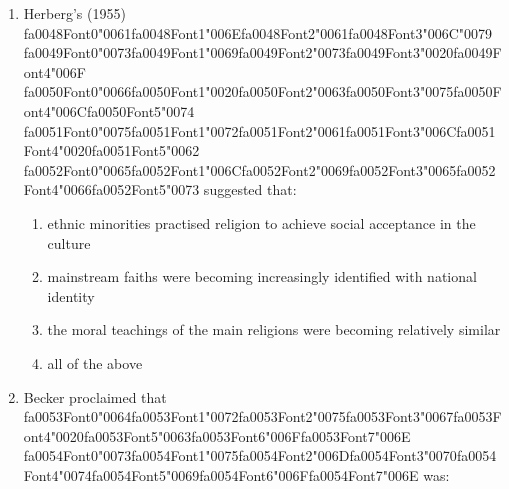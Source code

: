 \documentclass[12pt]{article}
\begin{document}
\begin{enumerate}[label=\arabic*.]
\begin{enumerate}[label=(\alph*)]
    \item punctuality, uninterrupted work and the threat of dismissal
    \item making routine tasks less monotonous
\end{enumerate}
\item Herberg's (1955) {\csname fa0048Font0\endcsname\char"0061}{\csname fa0048Font1\endcsname\char"006E}{\csname fa0048Font2\endcsname\char"0061}{\csname fa0048Font3\endcsname\char"006C}{\char"0079} {\csname fa0049Font0\endcsname\char"0073}{\csname fa0049Font1\endcsname\char"0069}{\csname fa0049Font2\endcsname\char"0073}{\csname fa0049Font3\endcsname\char"0020}{\csname fa0049Font4\endcsname\char"006F} {\csname fa0050Font0\endcsname\char"0066}{\csname fa0050Font1\endcsname\char"0020}{\csname fa0050Font2\endcsname\char"0063}{\csname fa0050Font3\endcsname\char"0075}{\csname fa0050Font4\endcsname\char"006C}{\csname fa0050Font5\endcsname\char"0074} {\csname fa0051Font0\endcsname\char"0075}{\csname fa0051Font1\endcsname\char"0072}{\csname fa0051Font2\endcsname\char"0061}{\csname fa0051Font3\endcsname\char"006C}{\csname fa0051Font4\endcsname\char"0020}{\csname fa0051Font5\endcsname\char"0062} {\csname fa0052Font0\endcsname\char"0065}{\csname fa0052Font1\endcsname\char"006C}{\csname fa0052Font2\endcsname\char"0069}{\csname fa0052Font3\endcsname\char"0065}{\csname fa0052Font4\endcsname\char"0066}{\csname fa0052Font5\endcsname\char"0073} suggested that:
\begin{enumerate}[label=(\alph*)]
    \item ethnic minorities practised religion to achieve social acceptance in the culture
    \item mainstream faiths were becoming increasingly identified with national identity
    \item the moral teachings of the main religions were becoming relatively similar
    \item all of the above
\end{enumerate}
\item Becker proclaimed that {\csname fa0053Font0\endcsname\char"0064}{\csname fa0053Font1\endcsname\char"0072}{\csname fa0053Font2\endcsname\char"0075}{\csname fa0053Font3\endcsname\char"0067}{\csname fa0053Font4\endcsname\char"0020}{\csname fa0053Font5\endcsname\char"0063}{\csname fa0053Font6\endcsname\char"006F}{\csname fa0053Font7\endcsname\char"006E} {\csname fa0054Font0\endcsname\char"0073}{\csname fa0054Font1\endcsname\char"0075}{\csname fa0054Font2\endcsname\char"006D}{\csname fa0054Font3\endcsname\char"0070}{\csname fa0054Font4\endcsname\char"0074}{\csname fa0054Font5\endcsname\char"0069}{\csname fa0054Font6\endcsname\char"006F}{\csname fa0054Font7\endcsname\char"006E} was:

\end{enumerate}
\end{document}
